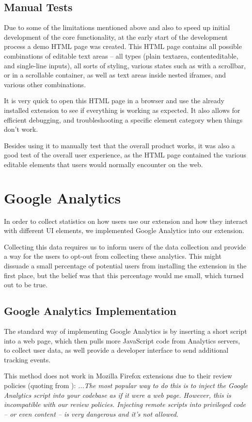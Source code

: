 \documentclass[bsc,frontabs,twoside,singlespacing,parskip,deptreport]{infthesis}
\begin{document}
\subsection{Manual Tests}
Due to some of the limitations mentioned above and also to speed up initial development of the core functionality, at the early start of the development process a demo HTML page was created. This HTML page contains all possible combinations of editable text areas -- all types (plain textarea, contenteditable, and single-line inputs), all sorts of styling, various states such as with a scrollbar, or in a scrollable container, as well as text areas inside nested iframes, and various other combinations.

It is very quick to open this HTML page in a browser and use the already installed extension to see if everything is working as expected. It also allows for efficient debugging, and troubleshooting a specific element category when things don't work.

Besides using it to manually test that the overall product works, it was also a good test of the overall user experience, as the HTML page contained the various editable elements that users would normally encounter on the web.

\section{Google Analytics}
In order to collect statistics on how users use our extension and how they interact with different UI elements, we implemented Google Analytics into our extension.

Collecting this data requires us to inform users of the data collection and provide a way for the users to opt-out from collecting these analytics. This might dissuade a small percentage of potential users from installing the extension in the first place, but the belief was that this percentage would me small, which turned out to be true.

\subsection{Google Analytics Implementation}
The standard way of implementing Google Analytics is by inserting a short script into a web page, which then pulls more JavaScript code from Analytics servers, to collect user data, as well provide a developer interface to send additional tracking events.

This method does not work in Mozilla Firefox extensions due to their review policies (quoting from \cite{A20}): \textit{...The most popular way to do this is to inject the Google Analytics script into your codebase as if it were a web page. However, this is incompatible with our review policies. Injecting remote scripts into privileged code – or even content – is very dangerous and it’s not allowed.}
\end{document}
